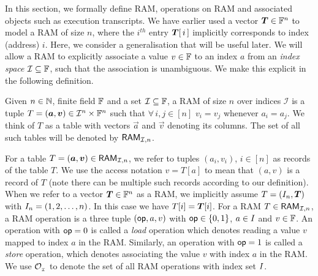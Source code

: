 In this section, we formally define RAM, operations on RAM and associated objects such as
execution transcripts. We have earlier used a vector $\vecT\in \F^n$ to model a RAM of size $n$, where the $i^{th}$ entry $\vecT[\,i\,]$
implicitly corresponds to index (address) $i$.
Here, we consider a generalisation that will be useful later.
We will allow a RAM to explicitly associate a value $v\in \mathbb{F}$ to an index $a$ from an {\em index space}
$\mathcal{I}\subseteq \mathbb{F}$, such that the association is unambiguous. We make this explicit in the following definition.
\begin{definition}[RAM]\label{defn:RAM}
    Given $n\in \mathbb{N}$, finite field $\mathbb{F}$ and a set $\mathcal{I}\subseteq \mathbb{F}$, a RAM of size $n$ over indices $\mathcal{I}$
    is a tuple $T=(\vec{a},\vec{v})\in \mathcal{I}^n\times \F^n$ such that $\forall\, i,j\in [n]$  $v_i=v_j$ whenever $a_i=a_j$.
    We think of $T$ as a table with vectors $\vec{a}$ and $\vec{v}$ denoting its columns. The set of all such
    tables will be denoted by $\mathsf{RAM}_{\mathcal{I}, {n}}$.
\end{definition}

For a table $T=(\vec{a},\vec{v})\in \RAM{I}{n}$, we refer to tuples $(a_i,v_i)$, $i\in [n]$ as records of the table $T$.
We use the access notation $v=T[a]$ to mean that $(a,v)$ is a record of $T$ (note there can be multiple such records
according to our definition). When we refer to a vector $\vecT\in \F^n$ as a RAM, we implicitly
assume $T=(\setind_n,\vecT)$ with $I_n=(1,2,\ldots,n)$. In this case we have $T[i]=\vecT[i]$.
For a RAM $T\in \mathsf{RAM}_{\mathcal{I}, {n}}$, a RAM operation is a three tuple $(\mathsf{op},a,v)$ with $\mathsf{op}\in \{0,1\}$,
$a\in I$ and $v\in \mathbb{F}$. An operation with $\mathsf{op}=0$ is called a {\em load} operation which denotes reading a value $v$
mapped to index $a$ in the RAM. Similarly, an operation with $\mathsf{op}=1$ is called a {\em store} operation,
which denotes associating the value $v$ with index $a$ in the RAM.
We use $\mathcal{O}_{{}_\mathcal{I}}$ to denote the set of all RAM operations with index set $I$.

